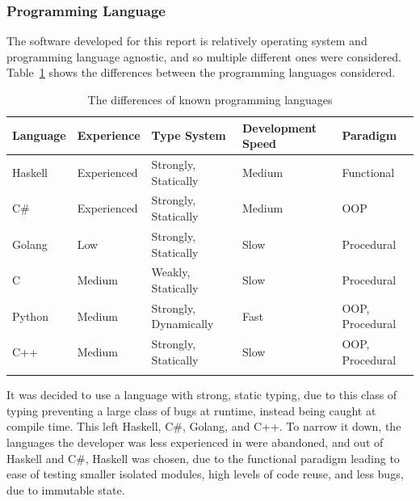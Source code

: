 \subsubsection{Programming Language}

The software developed for this report is relatively operating system and
programming language agnostic, and so multiple different ones were considered.
Table~\ref{table:langs} shows the differences between the programming languages
considered.

\begin{table}[H]
    \begin{adjustbox}{center}
    \begin{tabular}{l l l l l}
    \toprule
    Language             & Experience  & Type System            & Development Speed & Paradigm          \\
    \midrule
    Haskell              & Experienced & Strongly, Statically   & Medium            & Functional        \\ \addlinespace
    C\#                  & Experienced & Strongly, Statically   & Medium            & OOP               \\ \addlinespace
    Golang               & Low         & Strongly, Statically   & Slow              & Procedural        \\ \addlinespace
    C                    & Medium      & Weakly, Statically     & Slow              & Procedural        \\ \addlinespace
    Python               & Medium      & Strongly, Dynamically  & Fast              & OOP, Procedural   \\ \addlinespace
    C++                  & Medium      & Strongly, Statically   & Slow              & OOP, Procedural   \\ \addlinespace
    \bottomrule
    \end{tabular}
    \end{adjustbox}
    \caption{The differences of known programming languages}
    \label{table:langs}
\end{table}

It was decided to use a language with strong, static typing, due to this
class of typing preventing a large class of bugs at runtime, instead being
caught at compile time. This left Haskell, C\#, Golang, and C++. To narrow it
down, the languages the developer was less experienced in were abandoned,
and out of Haskell and C\#, Haskell was chosen, due to the functional paradigm
leading to ease of testing smaller isolated modules, high levels of code
reuse, and less bugs, due to immutable state.

